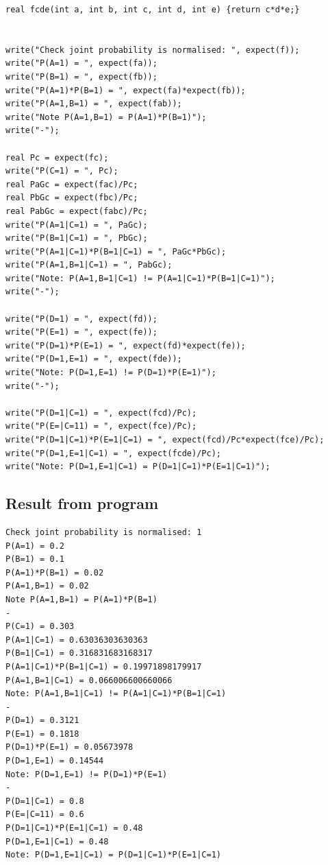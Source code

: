 \documentclass[11pt]{article}
\begin{document}
\begin{verbatim}
real fcde(int a, int b, int c, int d, int e) {return c*d*e;}


write("Check joint probability is normalised: ", expect(f));
write("P(A=1) = ", expect(fa));
write("P(B=1) = ", expect(fb));
write("P(A=1)*P(B=1) = ", expect(fa)*expect(fb));
write("P(A=1,B=1) = ", expect(fab));
write("Note P(A=1,B=1) = P(A=1)*P(B=1)");
write("-");

real Pc = expect(fc);
write("P(C=1) = ", Pc);
real PaGc = expect(fac)/Pc;
real PbGc = expect(fbc)/Pc;
real PabGc = expect(fabc)/Pc;
write("P(A=1|C=1) = ", PaGc);
write("P(B=1|C=1) = ", PbGc);
write("P(A=1|C=1)*P(B=1|C=1) = ", PaGc*PbGc);
write("P(A=1,B=1|C=1) = ", PabGc);
write("Note: P(A=1,B=1|C=1) != P(A=1|C=1)*P(B=1|C=1)");
write("-");

write("P(D=1) = ", expect(fd));
write("P(E=1) = ", expect(fe));
write("P(D=1)*P(E=1) = ", expect(fd)*expect(fe));
write("P(D=1,E=1) = ", expect(fde));
write("Note: P(D=1,E=1) != P(D=1)*P(E=1)");
write("-");

write("P(D=1|C=1) = ", expect(fcd)/Pc);
write("P(E=|C=11) = ", expect(fce)/Pc);
write("P(D=1|C=1)*P(E=1|C=1) = ", expect(fcd)/Pc*expect(fce)/Pc);
write("P(D=1,E=1|C=1) = ", expect(fcde)/Pc);
write("Note: P(D=1,E=1|C=1) = P(D=1|C=1)*P(E=1|C=1)");
\end{verbatim}

\subsection{Result from program}
\label{sec:org6feda02}
\begin{verbatim}
Check joint probability is normalised: 1
P(A=1) = 0.2
P(B=1) = 0.1
P(A=1)*P(B=1) = 0.02
P(A=1,B=1) = 0.02
Note P(A=1,B=1) = P(A=1)*P(B=1)
-
P(C=1) = 0.303
P(A=1|C=1) = 0.63036303630363
P(B=1|C=1) = 0.316831683168317
P(A=1|C=1)*P(B=1|C=1) = 0.19971898179917
P(A=1,B=1|C=1) = 0.066006600660066
Note: P(A=1,B=1|C=1) != P(A=1|C=1)*P(B=1|C=1)
-
P(D=1) = 0.3121
P(E=1) = 0.1818
P(D=1)*P(E=1) = 0.05673978
P(D=1,E=1) = 0.14544
Note: P(D=1,E=1) != P(D=1)*P(E=1)
-
P(D=1|C=1) = 0.8
P(E=|C=11) = 0.6
P(D=1|C=1)*P(E=1|C=1) = 0.48
P(D=1,E=1|C=1) = 0.48
Note: P(D=1,E=1|C=1) = P(D=1|C=1)*P(E=1|C=1)
\end{verbatim}
\end{document}
